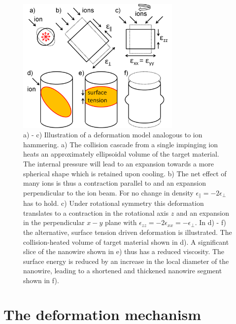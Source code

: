 \begin{figure}[thbp]
	\centering
		\includegraphics[width=8cm]{images/deformationmodel.jpg}
	\caption{a) - c) Illustration of a deformation model analogous to ion hammering. a) The collision cascade from a single impinging ion heats an approximately ellipsoidal volume of the target material. The internal pressure will lead to an expansion towards a more spherical shape which is retained upon cooling. b) The net effect of many ions is thus a contraction parallel to and an expansion perpendicular to the ion beam. For no change in density $\epsilon_\parallel = -2\epsilon_\perp$ has to hold. c) Under rotational symmetry this deformation translates to a contraction in the rotational axis $z$ and an expansion in the perpendicular $x-y$ plane with $\epsilon_{zz} = -2\epsilon_{xx} = -\epsilon_\perp$. In d) - f) the alternative, surface tension driven deformation is illustrated. The collision-heated volume of target material shown in d). A significant slice of the nanowire shown in e) thus has a reduced viscosity. The surface energy is reduced by an increase in the local diameter of the nanowire, leading to a shortened and thickened nanowire segment shown in f).} 
	\label{deformationmodel}
\end{figure}

\section{The deformation mechanism}

